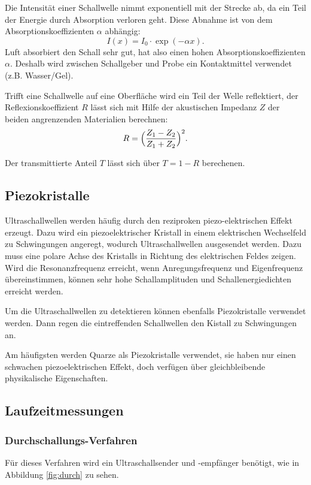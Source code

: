 Die Intensität einer Schallwelle nimmt exponentiell mit der Strecke ab, da
ein Teil der Energie durch Absorption verloren geht. Diese Abnahme ist von dem
Absorptionskoeffizienten $\alpha$ abhängig:
\begin{equation}
  I(x)=I_0\cdot \exp{(-\alpha x)}.
  \label{eqn:intensität}
\end{equation}
Luft absorbiert den Schall sehr gut, hat also einen hohen Absorptionskoeffizienten $\alpha$.
Deshalb wird zwischen Schallgeber und Probe ein Kontaktmittel verwendet (z.B. Wasser/Gel).

Trifft eine Schallwelle auf eine Oberfläche wird ein Teil der Welle reflektiert, der
Reflexionskoeffizient $R$ lässt sich mit Hilfe der akustischen Impedanz $Z$
der beiden angrenzenden Materialien berechnen:
\begin{equation}
  R=\Bigl(\frac{Z_1 -Z_2}{Z_1 +Z_2}\Bigr)^{2}.
  \label{refexion}
\end{equation}

Der transmittierte Anteil $T$ lässt sich über $T=1-R$ berechenen.


\subsection{Piezokristalle}
Ultraschallwellen werden häufig durch den reziproken piezo-elektrischen Effekt
erzeugt. Dazu wird ein piezoelektrischer Kristall in einem elektrischen
Wechselfeld zu Schwingungen angeregt, wodurch Ultraschallwellen
ausgesendet werden. Dazu muss eine polare Achse des Kristalls
in Richtung des elektrischen Feldes zeigen.
Wird die Resonanzfrequenz erreicht, wenn Anregungsfrequenz und Eigenfrequenz übereinstimmen, können
sehr hohe Schallamplituden und Schallenergiedichten erreicht werden.

Um die Ultraschallwellen zu detektieren können ebenfalls Piezokristalle
verwendet werden. Dann regen die eintreffenden Schallwellen den Kistall
zu Schwingungen an.

Am häufigsten werden Quarze als Piezokristalle verwendet, sie haben nur einen
schwachen piezoelektrischen Effekt, doch verfügen über gleichbleibende
physikalische Eigenschaften.

\subsection{Laufzeitmessungen}
\subsubsection{Durchschallungs-Verfahren}
Für dieses Verfahren wird ein Ultraschallsender und -empfänger benötigt, wie
in Abbildung \ref{fig:durch} zu sehen.

